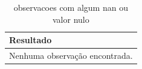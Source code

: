 \begin{table}[htbp]
\centering
\caption{observacoes com algum nan ou valor nulo}
\label{tab:observacoes-com-algum-nan-ou-valor-nulo}
\small
\setlength{\tabcolsep}{6pt}
\renewcommand{\arraystretch}{1.08}
\begin{tabular}{l}
\toprule
\textbf{Resultado} \\
\midrule
Nenhuma observação encontrada. \\
\bottomrule
\end{tabular}
\end{table}
